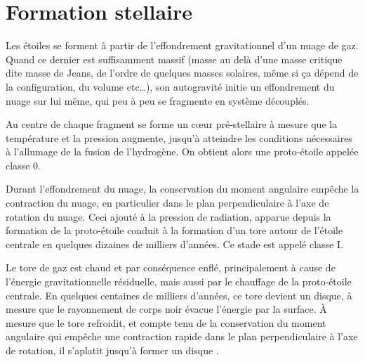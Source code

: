 


\section{Formation stellaire}
Les étoiles se forment à partir de l'effondrement gravitationnel d'un nuage de gaz. Quand ce dernier est suffisamment massif (masse au delà d'une masse critique dite masse de Jeans, de l'ordre de quelques masses solaires, même si ça dépend de la configuration, du volume etc\dots), son autogravité initie un effondrement du nuage sur lui même, qui peu à peu se fragmente en système découplés. 

Au centre de chaque fragment se forme un cœur pré-stellaire à mesure que la température et la pression augmente, jusqu'à atteindre les conditions nécessaires à l'allumage de la fusion de l'hydrogène. On obtient alors une proto-étoile appelée \og classe 0\fg. 

Durant l'effondrement du nuage, la conservation du moment angulaire empêche la contraction du nuage, en particulier dans le plan perpendiculaire à l'axe de rotation du nuage. Ceci ajouté à la pression de radiation, apparue depuis la formation de la proto-étoile conduit à la formation d'un tore autour de l'étoile centrale en quelques dizaines de milliers d'années. Ce stade est appelé \og classe I\fg.

Le tore de gaz est chaud et par conséquence enflé, principalement à cause de l'énergie gravitationnelle résiduelle, mais aussi par le chauffage de la proto-étoile centrale.
En quelques centaines de milliers d'années, ce tore devient un disque, à mesure que le rayonnement de corps noir évacue l'énergie par la surface. À mesure que le tore refroidit, et compte tenu de la conservation du moment angulaire qui empêche une contraction rapide dans le plan perpendiculaire à l'axe de rotation, il s'aplatit jusqu'à former un disque \citep{williams2011protoplanetary}. 

